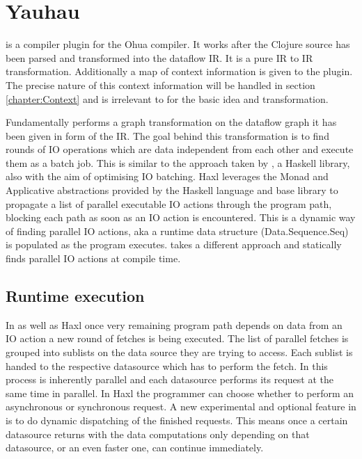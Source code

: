 \chapter{Yauhau}

\label{chapter:Yauhau}

\yauhau{} is a compiler plugin for the Ohua compiler.
It works after the Clojure source has been parsed and transformed into the dataflow IR.
It is a pure IR to IR transformation.
Additionally a map of context information is given to the plugin.
The precise nature of this context information will be handled in section \ref{chapter:Context} and is irrelevant to for the basic \yauhau{} idea and transformation.

Fundamentally \yauhau{} performs a graph transformation on the dataflow graph it has been given in form of the IR.
The goal behind this transformation is to find rounds of IO operations which are data independent from each other and execute them as a batch job.
This is similar to the approach taken by \cite{Haxl:library:link}, a Haskell library, also with the aim of optimising IO batching.
Haxl leverages the Monad and Applicative abstractions provided by the Haskell language and base library to propagate a list of parallel executable IO actions through the program path, blocking each path as soon as an IO action is encountered.
This is a dynamic way of finding parallel IO actions, aka a runtime data structure (Data.Sequence.Seq) is populated as the program executes.
\yauhau{} takes a different approach and statically finds parallel IO actions at compile time.

\section{Runtime execution}

In \yauhau{} as well as Haxl once very remaining program path depends on data from an IO action a new round of fetches is being executed.
The list of parallel fetches is grouped into sublists on the data source they are trying to access.
Each sublist is handed to the respective datasource which has to perform the fetch.
In \yauhau{} this process is inherently parallel and each datasource performs its request at the same time in parallel.
In Haxl the programmer can choose whether to perform an asynchronous or synchronous request.
A new experimental and optional feature in \yauhau{} is to do dynamic dispatching of the finished requests.
This means once a certain datasource returns with the data computations only depending on that datasource, or an even faster one, can continue immediately.

